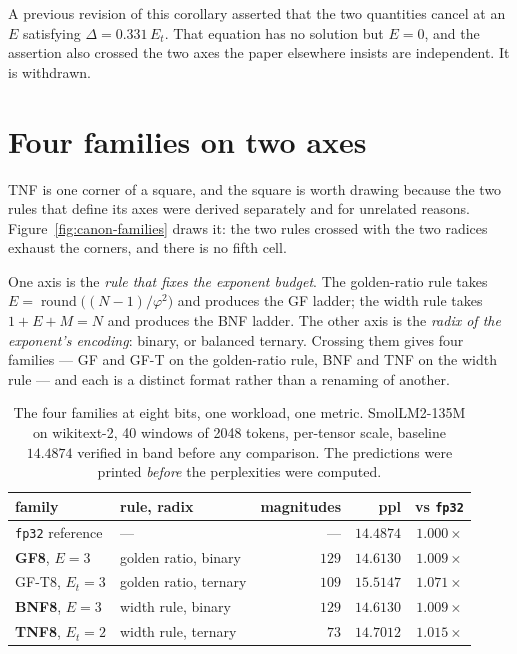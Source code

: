 \documentclass[11pt]{article}
\theoremstyle{definition}
\begin{document}
A previous revision of this corollary asserted that the two quantities cancel at
an $E$ satisfying $\Delta = 0.331\,E_t$. That equation has no solution but
$E = 0$, and the assertion also crossed the two axes the paper elsewhere insists
are independent. It is withdrawn.


\section{Four families on two axes}\label{sec:fourfamilies}

TNF is one corner of a square, and the square is worth drawing because the two
rules that define its axes were derived separately and for unrelated reasons.
Figure~\ref{fig:canon-families} draws it: the two rules crossed with the two
radices exhaust the corners, and there is no fifth cell.

One axis is the \emph{rule that fixes the exponent budget}. The golden-ratio
rule takes $E=\operatorname{round}\!\bigl((N-1)/\varphi^{2}\bigr)$ and produces
the GF ladder; the width rule takes $1+E+M=N$ and produces the BNF ladder. The
other axis is the \emph{radix of the exponent's encoding}: binary, or balanced
ternary. Crossing them gives four families --- GF and GF-T on the golden-ratio
rule, BNF and TNF on the width rule --- and each is a distinct format rather
than a renaming of another.

\begin{table}[t]\centering
\caption{The four families at eight bits, one workload, one metric.
SmolLM2-135M on wikitext-2, 40 windows of 2048 tokens, per-tensor scale,
baseline $14.4874$ verified in band before any comparison. The predictions were
printed \emph{before} the perplexities were computed.}
\label{tab:fourfam}
\begin{tabular}{llrrr}
\toprule
family & rule, radix & magnitudes & ppl & vs \texttt{fp32} \\
\midrule
\texttt{fp32} reference & --- & --- & $14.4874$ & $1.000\times$ \\
\midrule
\textbf{GF8}, $E{=}3$   & golden ratio, binary  & $129$ & $\mathbf{14.6130}$ & $1.009\times$ \\
GF-T8, $E_t{=}3$        & golden ratio, ternary & $109$ & $15.5147$ & $1.071\times$ \\
\textbf{BNF8}, $E{=}3$  & width rule, binary    & $129$ & $\mathbf{14.6130}$ & $1.009\times$ \\
\textbf{TNF8}, $E_t{=}2$& width rule, ternary   & $73$  & $\mathbf{14.7012}$ & $1.015\times$ \\
\bottomrule
\end{tabular}
\end{table}
\end{document}
